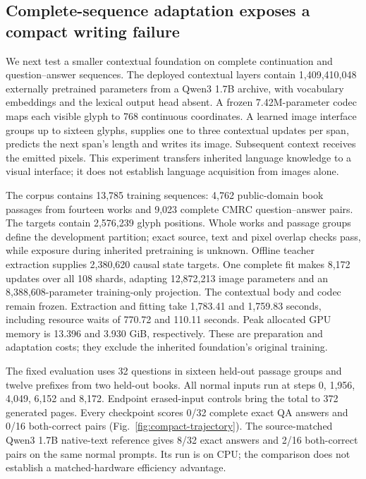 \documentclass[12pt,a4paper]{article}
\begin{document}
\subsection*{Complete-sequence adaptation exposes a compact writing failure}
We next test a smaller contextual foundation on complete continuation and
question--answer sequences. The deployed contextual layers contain 1,409,410,048
externally pretrained parameters from a Qwen3 1.7B archive\cite{qwen3}, with vocabulary
embeddings and the lexical output head absent. A frozen 7.42M-parameter codec
maps each visible glyph to 768 continuous coordinates. A learned image
interface groups up to sixteen glyphs, supplies one to three contextual
updates per span, predicts the next span's length and writes its image.
Subsequent context receives the emitted pixels. This experiment transfers
inherited language knowledge to a visual interface; it does not establish
language acquisition from images alone.

The corpus contains 13,785 training sequences: 4,762 public-domain book
passages from fourteen works and 9,023 complete CMRC question--answer pairs\cite{cmrc}.
The targets contain 2,576,239 glyph positions. Whole works and passage groups
define the development partition; exact source, text and pixel overlap checks
pass, while exposure during inherited pretraining is unknown. Offline teacher
extraction supplies 2,380,620 causal state targets. One complete fit makes
8,172 updates over all 108 shards, adapting 12,872,213 image parameters and
an 8,388,608-parameter training-only projection. The contextual body and codec
remain frozen. Extraction and fitting take 1,783.41 and 1,759.83 seconds,
including resource waits of 770.72 and 110.11 seconds. Peak allocated GPU
memory is 13.396 and 3.930 GiB, respectively. These are preparation and
adaptation costs; they exclude the inherited foundation's original training.

The fixed evaluation uses 32 questions in sixteen held-out passage groups and
twelve prefixes from two held-out books. All normal inputs run at steps 0,
1,956, 4,049, 6,152 and 8,172. Endpoint erased-input controls bring the total
to 372 generated pages. Every checkpoint scores 0/32 complete exact QA
answers and 0/16 both-correct pairs (Fig.~\ref{fig:compact-trajectory}).
The source-matched Qwen3 1.7B native-text reference gives 8/32 exact answers
and 2/16 both-correct pairs on the same normal prompts. Its run is on CPU;
the comparison does not establish a matched-hardware efficiency advantage.
\end{document}
